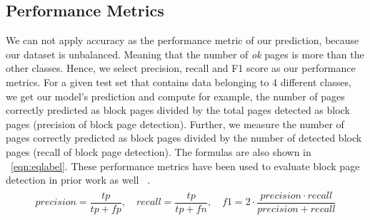 \documentclass{article} %
\begin{document}
\subsection{Performance Metrics}
We can not apply accuracy as the performance metric of our prediction, because our dataset is unbalanced. Meaning that the number of \textit{ok} pages is more than the other classes. Hence, we select precision, recall and F1 score as our performance metrics. For a given test set that contains data belonging to 4 different classes, we get our model's prediction and compute for example, the number of pages correctly predicted as block pages divided by the total pages detected as block pages (precision of block page detection). Further, we measure the number of pages correctly predicted as block pages divided by the number of detected block pages (recall of block page detection). The formulas are also shown in ~\ref{eqn:eqlabel}. These performance metrics have been used to evaluate block page detection in prior work as well ~\cite{imc14_phillipa}.
\begin{align}
\label{eqn:eqlabel}
\begin{split}
 precision = \dfrac{tp}{tp+fp} , \quad 
recall = \dfrac{tp}{tp+fn}, \quad 
f1 = 2 \cdot \dfrac{precision \cdot recall}{precision + recall}
\end{split}
\end{align}
\end{document}
